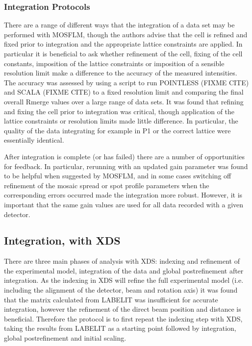 \documentclass[a4paper, 11pt]{article}
\begin{document}
\subsubsection{Integration Protocols}

There are a range of different ways that the integration of a data set may be performed with MOSFLM, though the authors advise that the cell is refined and fixed prior to integration and the appropriate lattice constraints are applied. In particular it is beneficial to ask whether refinement of the cell, fixing of the cell constants, imposition of the lattice constraints or imposition of a sensible resolution limit make a difference to the accuracy of the measured intensities. The accuracy was assessed by using a script to run POINTLESS (FIXME CITE) and SCALA (FIXME CITE) to a fixed resolution limit and comparing the final overall Rmerge values over a large range of data sets. It was found that refining and fixing the cell prior to integration was critical, though application of the lattice constraints or resolution limits made little difference. In particular, the quality of the data integrating for example in P1 or the correct lattice were essentially identical.

After integration is complete (or has failed) there are a number of opportunities for feedback. In particular, rerunning with an updated gain parameter was found to be helpful when suggested by MOSFLM, and in some cases switching off refinement of the mosaic spread or spot profile parameters when the corresponding errors occurred made the integration more robust. However, it is important that the same gain values are used for all data recorded with a given detector.

\subsection{Integration, with XDS}

There are three main phases of analysis with XDS: indexing and refinement of the experimental model, integration of the data and global postrefinement after integration. As the indexing in XDS will refine the full experimental model (i.e. including the alignment of the detector, beam and rotation axis) it was found that the matrix calculated from LABELIT was insufficient for accurate integration, however the refinement of the direct beam position and distance is beneficial. Therefore the protocol is to first repeat the indexing step with XDS, taking the results from LABELIT as a starting point followed by integration, global postrefinement and initial scaling. 
\end{document}
